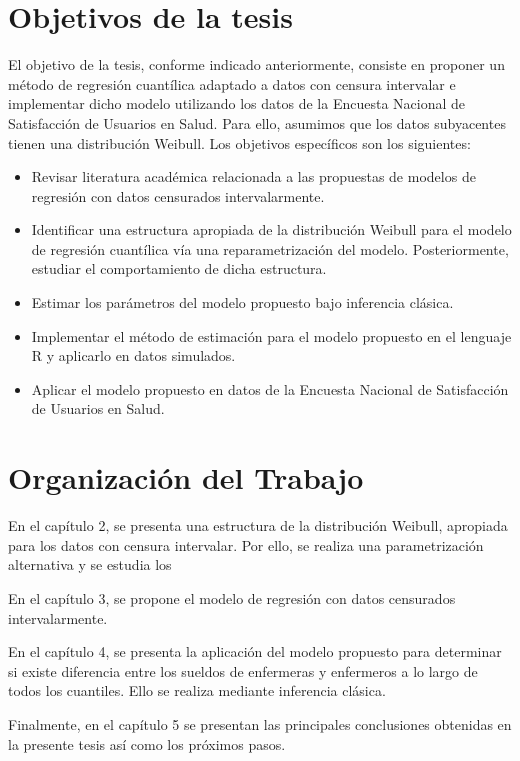 \documentclass{report}
\begin{document}
\section{Objetivos de la tesis}
El objetivo de la tesis, conforme indicado anteriormente, consiste en proponer un método de regresión cuantílica adaptado a datos con censura intervalar e implementar dicho modelo utilizando los datos de la Encuesta Nacional de Satisfacción de Usuarios en Salud. Para ello, asumimos que los datos subyacentes tienen una distribución Weibull. Los objetivos específicos son los siguientes:

\begin{itemize}
	\item Revisar literatura académica relacionada a las propuestas de modelos de regresión con datos censurados intervalarmente.
	\item Identificar una estructura apropiada de la distribución Weibull para el modelo de regresión cuantílica vía una reparametrización del modelo. Posteriormente, estudiar el comportamiento de dicha estructura.
	\item Estimar los parámetros del modelo propuesto bajo inferencia clásica.
	\item Implementar el método de estimación para el modelo propuesto en el lenguaje R y aplicarlo en datos simulados.
	\item Aplicar el modelo propuesto en datos de la Encuesta Nacional de Satisfacción de Usuarios en Salud.
\end{itemize}

\section{Organización del Trabajo}

En el capítulo 2, se presenta una estructura de la distribución Weibull, apropiada para los datos con censura intervalar. Por ello, se realiza una parametrización alternativa y se estudia los 

En el capítulo 3, se propone el modelo de regresión con datos censurados intervalarmente.

En el capítulo 4, se presenta la aplicación del modelo propuesto para determinar si existe diferencia entre los sueldos de enfermeras y enfermeros a lo largo de todos los cuantiles. Ello se realiza mediante inferencia clásica.

Finalmente, en el capítulo 5 se presentan las principales conclusiones obtenidas en la presente tesis así como los próximos pasos.
\end{document}
